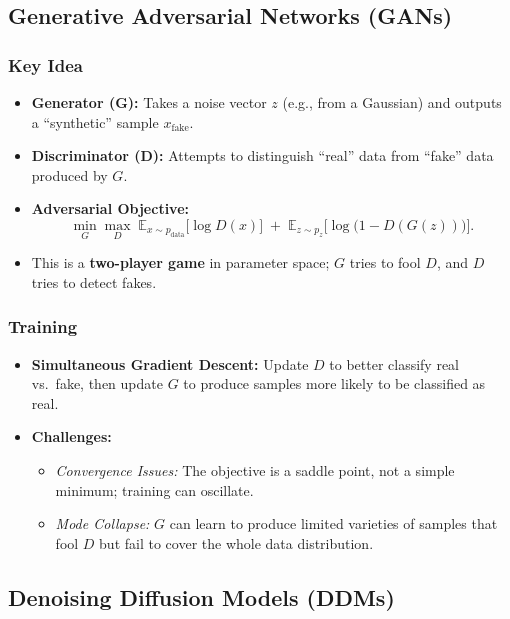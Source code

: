 \documentclass[twocolumn]{article}
\begin{document}
\begin{spacing}{1}
\subsection{Generative Adversarial Networks (GANs)}
\subsubsection{Key Idea}
\begin{itemize}
    \item \textbf{Generator (G):} Takes a noise vector $z$ (e.g., from a Gaussian) and outputs a “synthetic” sample $x_{\text{fake}}$.
    \item \textbf{Discriminator (D):} Attempts to distinguish “real” data from “fake” data produced by $G$.
    \item \textbf{Adversarial Objective:} 
    \[
        \min_G \max_D \; \mathbb{E}_{x \sim p_{\text{data}}}\bigl[\log D(x)\bigr]
        \;+\;
        \mathbb{E}_{z \sim p_z}\bigl[\log \bigl(1 - D(G(z))\bigr)\bigr].
    \]
    \item This is a \textbf{two-player game} in parameter space; $G$ tries to fool $D$, and $D$ tries to detect fakes.
\end{itemize}

\subsubsection{Training}
\begin{itemize}
    \item \textbf{Simultaneous Gradient Descent:} Update $D$ to better classify real vs.\ fake, then update $G$ to produce samples more likely to be classified as real.
    \item \textbf{Challenges:}
    \begin{itemize}
        \item \emph{Convergence Issues:} The objective is a saddle point, not a simple minimum; training can oscillate.
        \item \emph{Mode Collapse:} $G$ can learn to produce limited varieties of samples that fool $D$ but fail to cover the whole data distribution.
    \end{itemize}
\end{itemize}

\subsection{Denoising Diffusion Models (DDMs)}

\end{spacing}
\end{document}
